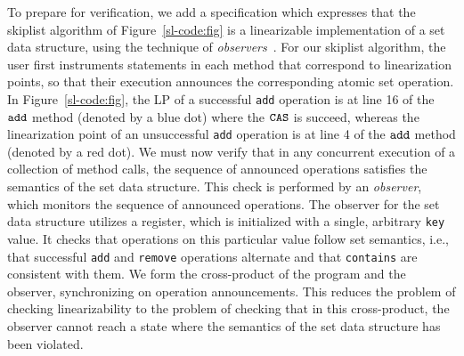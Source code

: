 To prepare for verification, we add a specification which expresses that
the skiplist algorithm of Figure~\ref{sl-code:fig} is a
linearizable implementation of a set data structure, using
the technique of
{\em observers}~\cite{AHHR:integrated,BEEH:icalp15,HSV:concur13,Quy:sas16}.
For our skiplist algorithm, the user first instruments statements in each
method that correspond to linearization points, so that their execution
announces the corresponding atomic set operation.
In Figure~\ref{sl-code:fig}, the LP of a successful {\tt add} operation is at line 16 of the $\tt add$ method (denoted by a blue dot) where the $\tt CAS$ is succeed, whereas the linearization point of an unsuccessful {\tt add} operation is at line 4 of the $\tt add$
method (denoted by a red dot).
We must now verify that in any concurrent
execution of a collection of method calls, the sequence of announced
operations satisfies the semantics of the set data structure.
This check is performed by an {\em observer}, which
monitors the sequence of announced operations. The observer for the set
data structure utilizes a register, which is initialized with
a single, arbitrary {\tt key} value.
It checks that operations on this particular value follow set semantics,
i.e., that successful {\tt add} and {\tt remove} operations alternate and that
{\tt contains} are consistent with them.
We form %
the cross-product of the program  and the observer, synchronizing on
operation announcements. This reduces the
problem of checking linearizability to the problem of checking that
in this cross-product, the observer cannot reach a state where
the semantics of the set data structure has been violated.



